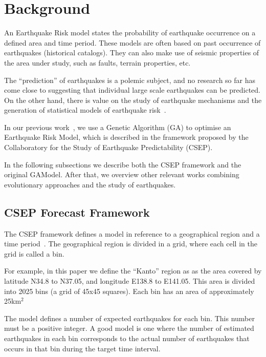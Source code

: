 \section{Background}
\label{sec:background}

An Earthquake Risk model states the probability of earthquake
occurrence on a defined area and time period. These models are often
based on past occurrence of earthquakes (historical catalogs).  They
can also make use of seismic properties of the area under study, such
as faults, terrain properties, etc.

The ``prediction'' of earthquakes is a polemic subject, and no
research so far has come close to suggesting that individual large
scale earthquakes can be predicted. On the other hand, there is value
on the study of earthquake mechanisms and the generation of
statistical models of earthquake risk~\cite{Nature1999}.

In our previous work~\cite{ecta14}, we use a Genetic Algorithm (GA) to
optimise an Earthquake Risk Model, which is described in the framework
proposed by the Collaboratory for the Study of Earthquake
Predictability (CSEP).

In the following subsections we describe both the CSEP framework and
the original GAModel. After that, we overview other relevant works
combining evolutionary approaches and the study of earthquakes.

\subsection{CSEP Forecast Framework}

The CSEP framework defines a model in reference to a geographical
region and a time period~\cite{zechar2010evaluating}. The geographical
region is divided in a grid, where each cell in the grid is called a
bin.

For example, in this paper we define the “Kanto” region as as the area
covered by latitude N34.8 to N37.05, and longitude E138.8 to
E141.05. This area is divided into 2025 bins (a grid of 45x45
squares).  Each bin has an area of approximately 25km$^2$

The model defines a number of expected earthquakes for each bin.  This
number must be a positive integer. A good model is one where the
number of estimated earthquakes in each bin corresponds to the actual
number of earthquakes that occurs in that bin during the target time
interval.



